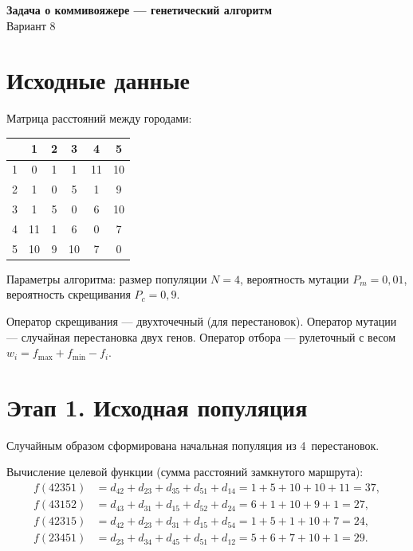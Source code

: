 \documentclass[a4paper,12pt]{article}
\begin{document}
\begin{center}
\Large\textbf{Задача о коммивояжере --- генетический алгоритм}\\[4pt]
\large Вариант 8
\end{center}

\section*{Исходные данные}

Матрица расстояний между городами:

\begin{center}
\begin{tabular}{c|ccccc}
\toprule
 & 1 & 2 & 3 & 4 & 5 \\
\midrule
1 & 0  & 1  & 1  & 11 & 10 \\
2 & 1  & 0  & 5  & 1  & 9  \\
3 & 1  & 5  & 0  & 6  & 10 \\
4 & 11 & 1  & 6  & 0  & 7  \\
5 & 10 & 9  & 10 & 7  & 0  \\
\bottomrule
\end{tabular}
\end{center}

Параметры алгоритма: размер популяции $N = 4$, вероятность мутации $P_m = 0{,}01$, вероятность скрещивания $P_c = 0{,}9$.

Оператор скрещивания --- двухточечный (для перестановок).
Оператор мутации --- случайная перестановка двух генов.
Оператор отбора --- рулеточный с весом $w_i = f_{\max} + f_{\min} - f_i$.

\section*{Этап 1. Исходная популяция}

Случайным образом сформирована начальная популяция из 4~перестановок.

Вычисление целевой функции (сумма расстояний замкнутого маршрута):
\begin{align*}
f(42351) &= d_{42}+d_{23}+d_{35}+d_{51}+d_{14} = 1+5+10+10+11 = 37,\\
f(43152) &= d_{43}+d_{31}+d_{15}+d_{52}+d_{24} = 6+1+10+9+1 = 27,\\
f(42315) &= d_{42}+d_{23}+d_{31}+d_{15}+d_{54} = 1+5+1+10+7 = 24,\\
f(23451) &= d_{23}+d_{34}+d_{45}+d_{51}+d_{12} = 5+6+7+10+1 = 29.
\end{align*}
\end{document}
